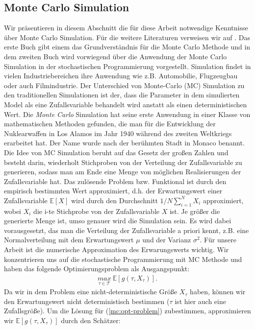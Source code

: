 \documentclass[12pt,titlepage,headsepline]{article}
\begin{document}
      \subsection{Monte Carlo Simulation}\label{appendix:mc-methode}
      Wir präsentieren in diesem Abschnitt die für diese Arbeit notwendige Kenntnisse über Monte Carlo Simulation. Für die weitere Literaturen verweisen wir auf \cite{kalos_monte_2008, shapiro_stochastic_2000}. Das erste Buch gibt einem das Grundverständnis für die Monte Carlo Methode und in dem zweiten Buch wird vorwiegend über die Anwendung der Monte Carlo Simulation in der stochastischen Programmierung vorgestellt.
      \hfill\break
      Simulation findet in vielen Industriebereichen ihre Anwendung wie z.B. Automobilie, Flugzeugbau oder auch Filmindustrie. Der Unterschied von Monte-Carlo (MC) Simulation zu den traditionellen Simulationen ist der, dass die Parameter in dem simulierten Model als eine Zufallsvariable behandelt wird anstatt als einen deterministischen Wert. Die \textit{Monte Carlo} Simulation hat seine erste Anwendung in einer Klasse von mathematischen Methoden gefunden, die man für die Entwicklung der Nuklearwaffen in Los Alamos im Jahr 1940 während des zweiten Weltkriegs erarbeitet hat. Der Name wurde nach der berühmten Stadt in Monaco benannt.
      \hfill\break
      Die Idee von MC Simulation beruht auf das Gesetz der großen Zahlen und besteht darin, wiederholt Stichproben von der Verteilung der Zufallsvariable zu generieren, sodass man am Ende eine Menge von möglichen Realisierungen der Zufallsvariable hat. Das zulösende Problem bzw. Funktional ist durch den empirisch bestimmten Wert approximiert, d.h. der Erwartungswert einer Zufallsvariable $\mathbb{E}[X]$ wird durch den Durchschnitt $1/N \sum_{i=1}^N X_i$ approximiert, wobei $X_i$ die i-te Stichprobe von der Zufallsvariable $X$ ist. Je größer die generierte Menge ist, umso genauer wird die Simulation sein. Es wird dabei vorausgesetzt, das man die Verteilung der Zufallsvariable a priori kennt, z.B. eine Normalverteilung mit dem Erwartungswert $\mu$ und der Varianz $\sigma^2$.
      \hfill\break
      Für unsere Arbeit ist die numerische Approximation des Erwarungswerts wichtig. Wir konzentrieren uns auf die stochastische Programmierung mit MC Methode und haben das folgende Optimierungsproblem als Ausgangspunkt:
      \begin{align}\label{mc:opt-problem}
        \underset{\tau \in \mathcal{T}}{max} \ \mathbb{E}[g(\tau,X_{\tau})].
      \end{align}
      Da wir in dem Problem eine nicht-deterministische Größe $X_{\tau}$ haben, können wir den Erwartungswert nicht deterministisch bestimmen ($\tau$ ist hier auch eine Zufallsgröße). Um die Lösung für (\ref{mc:opt-problem}) zubestimmen, approximieren wir $\mathbb{E}[g(\tau,X_{\tau})]$ durch den Schätzer:
\end{document}
